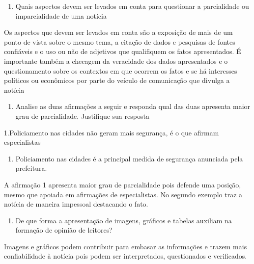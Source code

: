 \begin{enumerate}
\def\labelenumi{\arabic{enumi})}
\setcounter{enumi}{7}
\tightlist
\item
  Quais aspectos devem ser levados em conta para questionar a
  parcialidade ou imparcialidade de uma notícia
\end{enumerate}

Os aspectos que devem ser levados em conta são a exposição de mais de um
ponto de vista sobre o mesmo tema, a citação de dados e pesquisas de
fontes confiáveis e o uso ou não de adjetivos que qualifiquem os fatos
apresentados. É importante também a checagem da veracidade dos dados
apresentados e o questionamento sobre os contextos em que ocorrem os
fatos e se há interesses políticos ou econômicos por parte do veículo de
comunicação que divulga a notícia

\begin{enumerate}
\def\labelenumi{\arabic{enumi})}
\setcounter{enumi}{8}
\tightlist
\item
  Analise as duas afirmações a seguir e responda qual das duas apresenta
  maior grau de parcialidade. Justifique sua resposta
\end{enumerate}

1.Policiamento nas cidades não geram mais segurança, é o que afirmam
especialistas

\begin{enumerate}
\def\labelenumi{\arabic{enumi}.}
\tightlist
\item
  Policiamento nas cidades é a principal medida de segurança anunciada
  pela prefeitura.
\end{enumerate}

A afirmação 1 apresenta maior grau de parcialidade pois defende uma
posição, mesmo que apoiada em afirmações de especialistas. No segundo
exemplo traz a notícia de maneira impessoal destacando o fato.

\begin{enumerate}
\def\labelenumi{\arabic{enumi})}
\setcounter{enumi}{9}
\tightlist
\item
  De que forma a apresentação de imagens, gráficos e tabelas auxiliam na
  formação de opinião de leitores?
\end{enumerate}

Imagens e gráficos podem contribuir para embasar as informações e trazem
mais confiabilidade à notícia pois podem ser interpretados, questionados
e verificados.


